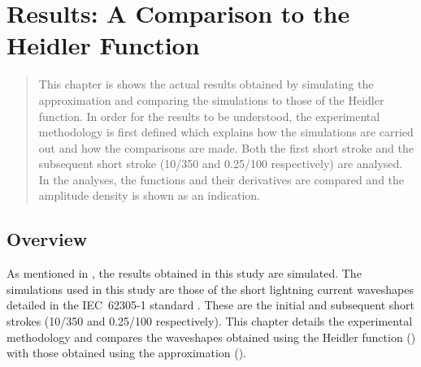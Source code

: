 
\chapter{Results: A Comparison to the Heidler Function} %

\label{ChapterResults} %


\begin{quote}
This chapter is shows the actual results obtained by simulating the approximation and comparing the simulations to those of the Heidler function. In order for the results to be understood, the experimental methodology is first defined which explains how the simulations are carried out and how the comparisons are made. Both the first short stroke and the subsequent short stroke (10/350 and 0.25/100 respectively) are analysed. In the analyses, the functions and their derivatives are compared and the amplitude density is shown as an indication.
\end{quote}


\section{Overview}
\label{sec:results_overview}
As mentioned in , the results obtained in this study are simulated. The simulations used in this study are those of the short lightning current waveshapes detailed in the IEC~62305-1 standard \cite{IEC623051}. These are the initial and subsequent short strokes (10/350 and 0.25/100 respectively). This chapter details the experimental methodology and compares the waveshapes obtained using the Heidler function () with those obtained using the approximation ().


